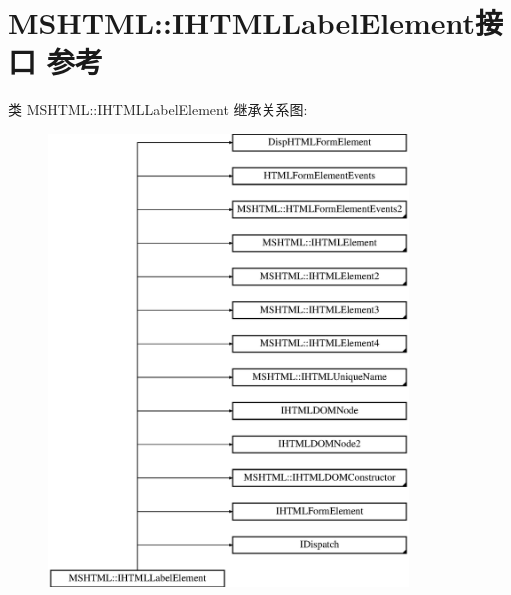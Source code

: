 \hypertarget{interface_m_s_h_t_m_l_1_1_i_h_t_m_l_label_element}{}\section{M\+S\+H\+T\+ML\+:\+:I\+H\+T\+M\+L\+Label\+Element接口 参考}
\label{interface_m_s_h_t_m_l_1_1_i_h_t_m_l_label_element}
类 M\+S\+H\+T\+ML\+:\+:I\+H\+T\+M\+L\+Label\+Element 继承关系图\+:\begin{figure}[H]
\begin{center}
\leavevmode
\includegraphics[height=12.000000cm]{interface_m_s_h_t_m_l_1_1_i_h_t_m_l_label_element}
\end{center}
\end{figure}
